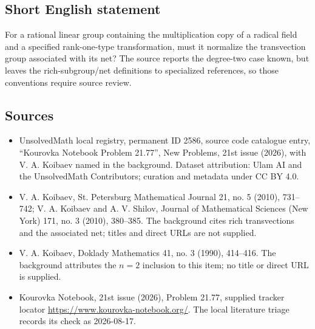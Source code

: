 \documentclass[11pt]{article}
\begin{document}
\subsection{Short English statement}
For a rational linear group containing the multiplication copy of a radical field and a specified rank-one-type transformation, must it normalize the transvection group associated with its net? The source reports the degree-two case known, but leaves the rich-subgroup/net definitions to specialized references, so those conventions require source review.
\subsection{Sources}
\begin{itemize}
\item UnsolvedMath local registry, permanent ID 2586, source code catalogue entry, ``Kourovka Notebook Problem 21.77'', New Problems, 21st issue (2026), with V. A. Koibaev named in the background. Dataset attribution: Ulam AI and the UnsolvedMath Contributors; curation and metadata under CC BY 4.0.
\item V. A. Koibaev, St. Petersburg Mathematical Journal 21, no. 5 (2010), 731--742; V. A. Koibaev and A. V. Shilov, Journal of Mathematical Sciences (New York) 171, no. 3 (2010), 380--385. The background cites rich transvections and the associated net; titles and direct URLs are not supplied.
\item V. A. Koibaev, Doklady Mathematics 41, no. 3 (1990), 414--416. The background attributes the $n=2$ inclusion to this item; no title or direct URL is supplied.
\item Kourovka Notebook, 21st issue (2026), Problem 21.77, supplied tracker locator \url{https://www.kourovka-notebook.org/}. The local literature triage records its check as 2026-08-17.
\end{itemize}
\end{document}
